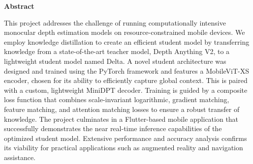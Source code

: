 \documentclass[10pt, a4paper]{report}
\newcommand\mainmatter{%
    \cleardoublepage
    \pagenumbering{arabic}}
\begin{document}

\begin{center}
    \huge\bfseries Abstract
\end{center}
\large
This project addresses the challenge of running computationally intensive monocular depth estimation models on resource-constrained mobile devices. We employ knowledge distillation to create an efficient student model by transferring knowledge from a state-of-the-art teacher model, Depth Anything V2, to a lightweight student model named Delta. A novel student architecture was designed and trained using the PyTorch framework and features a MobileViT-XS encoder, chosen for its ability to efficiently capture global context. This is paired with a custom, lightweight MiniDPT decoder. Training is guided by a composite loss function that combines scale-invariant logarithmic, gradient matching, feature matching, and attention matching losses to ensure a robust transfer of knowledge. The project culminates in a Flutter-based mobile application that successfully demonstrates the near real-time inference capabilities of the optimized student model. Extensive performance and accuracy analysis confirms its viability for practical applications such as augmented reality and navigation assistance.



\tableofcontents
\newpage


\listoffigures
\newpage

\listoftables
\newpage

\mainmatter








\newpage




\end{document}
